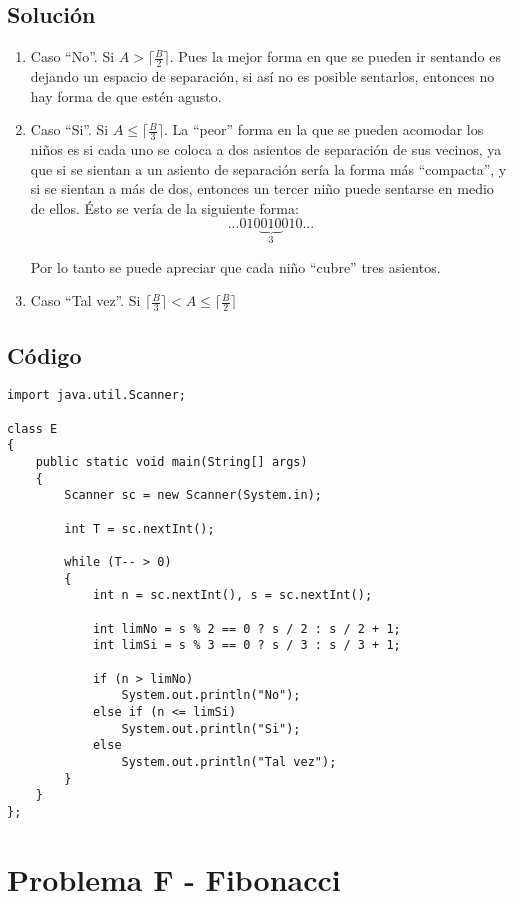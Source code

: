\subsection*{Solución}
\begin{enumerate}
\item Caso ``No''. Si $A > \Big\lceil \frac{B}{2} \Big\rceil$. Pues la mejor forma en que se pueden ir sentando es dejando un espacio de separación, si así no es posible sentarlos, entonces no hay forma de que estén agusto.
\item Caso ``Si''. Si $A \leq \Big\lceil \frac{B}{3} \Big\rceil$. La ``peor'' forma en la que se pueden acomodar los niños es si cada uno se coloca a dos asientos de separación de sus vecinos, ya que si se sientan a un asiento de separación sería la forma más ``compacta'', y si se sientan a más de dos, entonces un tercer niño puede sentarse en medio de ellos. Ésto se vería de la siguiente forma:
\[
...010\underbrace{010}_{3}010...
\]

Por lo tanto se puede apreciar que cada niño ``cubre'' tres asientos.
\item Caso ``Tal vez''. Si $\Big\lceil \frac{B}{3} \Big\rceil < A \leq \Big\lceil \frac{B}{2} \Big\rceil$
\end{enumerate}
\subsection*{Código}

\begin{verbatim}
import java.util.Scanner;
 
class E
{
    public static void main(String[] args)
    {
        Scanner sc = new Scanner(System.in);
 
        int T = sc.nextInt();
         
        while (T-- > 0)
        {
            int n = sc.nextInt(), s = sc.nextInt();
 
            int limNo = s % 2 == 0 ? s / 2 : s / 2 + 1;
            int limSi = s % 3 == 0 ? s / 3 : s / 3 + 1;
 
            if (n > limNo)
                System.out.println("No");
            else if (n <= limSi)
                System.out.println("Si");
            else
                System.out.println("Tal vez");
        }
    }
};
\end{verbatim}

\section{Problema F - Fibonacci}

